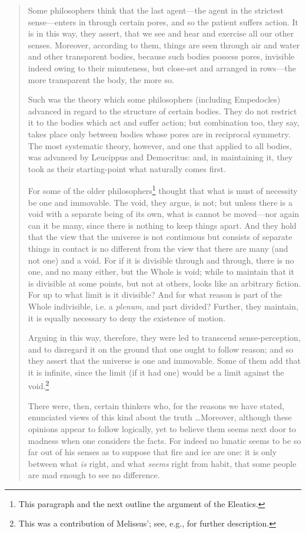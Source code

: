 \begin{quotation}
Some philosophers think that the last agent---the agent in the strictest sense---enters in through certain pores, and so the patient suffers action. It is in this way, they assert, that we see and hear and exercise all our other senses. Moreover, according to them, things are seen through air and water and other transparent bodies, because such bodies possess pores, invisible indeed owing to their minuteness, but close-set and arranged in rows---the more transparent the body, the more so.

Such was the theory which some philosophers (including Empedocles) advanced in regard to the structure of certain bodies. They do not restrict it to the bodies which act and suffer action; but combination too, they say, takes place only between bodies whose pores are in reciprocal symmetry. The most systematic theory, however, and one that applied to all bodies, was advanced by Leucippus and Democritus: and, in maintaining it, they took as their starting-point what naturally comes first. 

For some of the older philosophers\footnote{This paragraph and the next outline the argument of the Eleatics.} thought that what is must of necessity be one and immovable. The void, they argue, is not; but unless there is a void with a separate being of its own, what is cannot be moved---nor again can it be many, since there is nothing to keep things apart. And they hold that the view that the universe is not continuous but consists of separate things in contact is no different from the view that there are many (and not one) and a void. For if it is divisible through and through, there is no one, and no many either, but the Whole is void; while to maintain that it is divisible at some points, but not at others, looks like an arbitrary fiction. For up to what limit is it divisible? And for what reason is part of the Whole indivisible, i.e. a \textit{plenum}, and part divided? Further, they maintain, it is equally necessary to deny the existence of motion.

Arguing in this way, therefore, they were led to transcend sense-perception, and to disregard it on the ground that one ought to follow reason; and so they assert that the universe is one and immovable. Some of them add that it is infinite, since the limit (if it had one) would be a limit against the void.\footnote{This was a contribution of Melissus'; see, e.g., \cite{Barnes1982} for further description.}

There were, then, certain thinkers who, for the reasons we have stated, enunciated views of this kind about the truth \ldots Moreover, although these opinions appear to follow logically, yet to believe them seems next door to madness when one considers the facts. For indeed no lunatic seems to be so far out of his senses as to suppose that fire and ice are one: it is only between what \textit{is} right, and what \textit{seems} right from habit, that some people are mad enough to see no difference.


\end{quotation}
